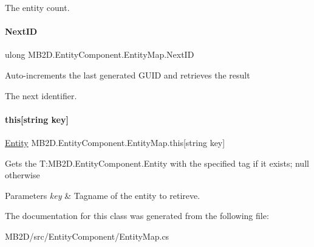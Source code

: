 The entity count.\hypertarget{class_m_b2_d_1_1_entity_component_1_1_entity_map_a812155313251122f297b6653ab4f4ec1}{}\label{class_m_b2_d_1_1_entity_component_1_1_entity_map_a812155313251122f297b6653ab4f4ec1} 
\paragraph{\texorpdfstring{Next\+ID}{NextID}}
{\footnotesize\ttfamily ulong M\+B2\+D.\+Entity\+Component.\+Entity\+Map.\+Next\+ID\hspace{0.3cm}{\ttfamily [get]}}



Auto-\/increments the last generated G\+U\+ID and retrieves the result 

The next identifier.\hypertarget{class_m_b2_d_1_1_entity_component_1_1_entity_map_ae29ad08673cc4c756b43bd3a72c35b84}{}\label{class_m_b2_d_1_1_entity_component_1_1_entity_map_ae29ad08673cc4c756b43bd3a72c35b84} 
\paragraph{\texorpdfstring{this[string key]}{this[string key]}}
{\footnotesize\ttfamily \hyperlink{class_m_b2_d_1_1_entity_component_1_1_entity}{Entity} M\+B2\+D.\+Entity\+Component.\+Entity\+Map.\+this\mbox{[}string key\mbox{]}\hspace{0.3cm}{\ttfamily [get]}}



Gets the T\+:\+M\+B2\+D.\+Entity\+Component.\+Entity with the specified tag if it exists; null otherwise 


\begin{DoxyParams}{Parameters}
{\em key} & Tagname of the entity to retireve.\\
\hline
\end{DoxyParams}


The documentation for this class was generated from the following file\+:\begin{DoxyCompactItemize}
\item 
M\+B2\+D/src/\+Entity\+Component/Entity\+Map.\+cs\end{DoxyCompactItemize}
